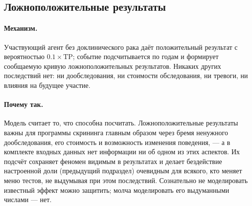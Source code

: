 \documentclass[12pt,a4paper]{article}
\newcommand{\mech}[1]{\paragraph{Механизм.} #1}
\newcommand{\why}[1]{\paragraph{Почему так.} #1}
\begin{document}
\subsection{Ложноположительные результаты}

\mech{Участвующий агент без доклинического рака даёт положительный результат с вероятностью
$0.1\times\text{TP}$; событие подсчитывается по годам и формирует сообщаемую кривую ложноположительных
результатов. Никаких других последствий нет: ни дообследования, ни стоимости обследования, ни тревоги, ни
влияния на будущее участие.}

\why{Модель считает то, что способна посчитать. Ложноположительные результаты важны для программы скрининга
главным образом через бремя ненужного дообследования, его стоимость и возможность изменения поведения, ---
а в комплекте входных данных нет информации ни об одном из этих аспектов. Их подсчёт сохраняет феномен
видимым в результатах и делает бездействие настроенной доли (предыдущий подраздел) очевидным для всякого,
кто меняет меню тестов, не выдумывая при этом последствий. Сознательно не моделировать известный эффект
можно защитить; молча моделировать его выдуманными числами --- нет.}
\end{document}
